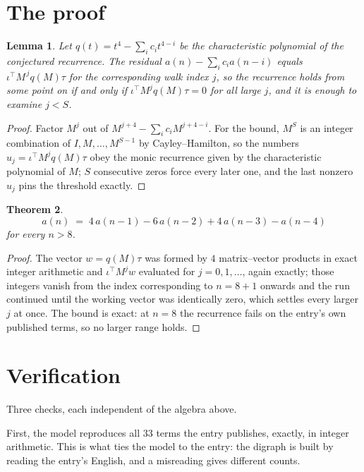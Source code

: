 \documentclass[11pt,a4paper]{article}
\theoremstyle{plain}
\newtheorem{theorem}{Theorem}
\newtheorem{lemma}[theorem]{Lemma}
\theoremstyle{definition}
\begin{document}
\section{The proof}

\begin{lemma}\label{lem:crit}
Let $q(t)=t^{4}-\sum_i c_it^{4-i}$ be the characteristic polynomial of the
conjectured recurrence. The residual $a(n)-\sum_ic_ia(n-i)$ equals
$\iota^{\!\top}M^{\,j}q(M)\tau$ for the corresponding walk index $j$, so the recurrence
holds from some point on if and only if $\iota^{\!\top}M^{j}q(M)\tau=0$ for all large $j$,
and it is enough to examine $j<S$.
\end{lemma}

\begin{proof}
Factor $M^{j}$ out of $M^{j+4}-\sum_ic_iM^{j+4-i}$. For the bound, $M^{S}$
is an integer combination of $I,M,\dots,M^{S-1}$ by Cayley--Hamilton, so the numbers
$u_j=\iota^{\!\top}M^{j}q(M)\tau$ obey the monic recurrence given by the characteristic
polynomial of $M$; $S$ consecutive zeros force every later one, and the last nonzero $u_j$
pins the threshold exactly.
\end{proof}

\begin{theorem}
\[
a(n)\;=\;4\,a(n-1) - 6\,a(n-2) + 4\,a(n-3) - a(n-4)
\]
for every $n>8$.
\end{theorem}

\begin{proof}
The vector $w=q(M)\tau$ was formed by $4$ matrix--vector products in exact integer
arithmetic and $\iota^{\!\top}M^{j}w$ evaluated for $j=0,1,\dots$, again exactly; those
integers vanish from the index corresponding to $n=8+1$ onwards and the run continued
until the working vector was identically zero, which settles every larger $j$ at once. The bound is exact: at $n=8$ the recurrence fails on the entry's own published terms, so no larger range holds.
\end{proof}

\section{Verification}

Three checks, each independent of the algebra above.

First, the model reproduces all $33$ terms the entry publishes, exactly, in integer
arithmetic. This is what ties the model to the entry: the digraph is built by reading the
entry's English, and a misreading gives different counts.
\end{document}

